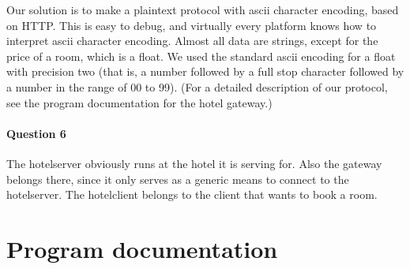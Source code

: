 \documentclass[a4paper,10pt]{article}
\begin{document}
Our solution is to make a plaintext protocol with ascii character encoding, based on HTTP. This is easy to debug, and virtually every platform knows how to interpret ascii character encoding. Almost all data are strings, except for the price of a room, which is a float. We used the standard ascii encoding for a float with precision two (that is, a number followed by a full stop character followed by a number in the range of 00 to 99). (For a detailed description of our protocol, see the program documentation for the hotel gateway.)

\paragraph{Question 6}
The hotelserver obviously runs at the hotel it is serving for. Also the gateway belongs there, since it only serves as a generic means to connect to the hotelserver. The hotelclient belongs to the client that wants to book a room.

\section{Program documentation}
\end{document}
